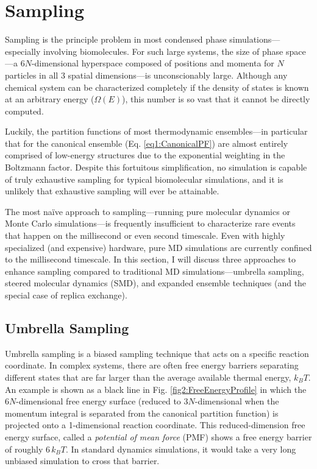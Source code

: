 \section{Sampling}

Sampling is the principle problem in most condensed phase
simulations---especially involving biomolecules. For such large systems, the
size of phase space---a $6N$-dimensional hyperspace composed of positions and
momenta for $N$ particles in all 3 spatial dimensions---is unconscionably large.
Although any chemical system can be characterized completely if the density of
states is known at an arbitrary energy ($\Omega(E)$), this number is so vast
that it cannot be directly computed.

Luckily, the partition functions of most thermodynamic ensembles---in particular
that for the canonical ensemble (Eq. \ref{eq1:CanonicalPF}) are almost
entirely comprised of low-energy structures due to the exponential weighting in
the Boltzmann factor. Despite this fortuitous simplification, no simulation is
capable of truly exhaustive sampling for typical biomolecular simulations, and
it is unlikely that exhaustive sampling will ever be attainable. 

The most na\"ive approach to sampling---running pure molecular dynamics or Monte
Carlo simulations---is frequently insufficient to characterize rare events that
happen on the millisecond or even second timescale. Even with highly specialized
(and expensive) hardware, pure MD simulations are currently confined to the
millisecond timescale. \cite{Shaw2010} In this section, I will discuss three
approaches to enhance sampling compared to traditional MD simulations---umbrella
sampling, steered molecular dynamics (SMD), and expanded ensemble techniques
(and the special case of replica exchange).

\subsection{Umbrella Sampling}

Umbrella sampling is a biased sampling technique that acts on a specific
reaction coordinate. In complex systems, there are often free energy barriers
separating different states that are far larger than the average available
thermal energy, $k_BT$. An example is shown as a black line in Fig.
\ref{fig2:FreeEnergyProfile} in which the $6N$-dimensional free energy surface
(reduced to $3N$-dimensional when the momentum integral is separated from the
canonical partition function) is projected onto a 1-dimensional reaction
coordinate. This reduced-dimension free energy surface, called a \emph{potential
of mean force} (PMF) shows a free energy barrier of roughly $6\,k_BT$. In
standard dynamics simulations, it would take a very long unbiased simulation to
cross that barrier.

